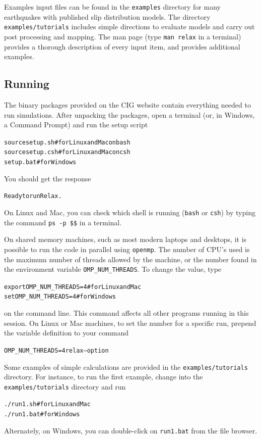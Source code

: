 \documentclass[10pt]{article}
\begin{document}
Examples input files can be found in the \verb'examples' directory for many earthquakes with published slip distribution models. The directory \verb'examples/tutorials' includes simple directions to evaluate models and carry out post processing and mapping. The man page (type \verb'man relax' in a terminal) provides a thorough description of every input item, and provides additional examples.

\subsection{Running}


The binary packages provided on the CIG website contain everything needed to run simulations.  After unpacking the packages, open a terminal (or, in Windows, a Command Prompt) and run the setup script
\begin{alltt}
{\color{orange}source setup.sh}  # for Linux and Mac on bash
{\color{orange}source setup.csh} # for Linux and Mac on csh
{\color{orange}setup.bat}        # for Windows
\end{alltt}
You should get the response
\begin{alltt}
{\color{NavyBlue}Ready to run Relax.}
\end{alltt}
On Linux and Mac, you can check which shell is running (\verb`bash` or \verb`csh`) by typing the command \verb`ps -p $$` in a terminal.

On shared memory machines, such as most modern laptops and desktops, it is possible to run the code in parallel using \verb'openmp'. The number of CPU's used is the maximum number of threads allowed by the machine, or the number found in the environment variable \verb'OMP_NUM_THREADS'. To change the value, type
\begin{alltt}
{\color{orange}export OMP_NUM_THREADS=4} # for Linux and Mac
{\color{orange}set OMP_NUM_THREADS=4}    # for Windows
\end{alltt}
on the command line. This command affects all other programs running
in this session. On Linux or Mac machines, to set the number for a
specific run, prepend the variable definition to your command
\begin{alltt}
{\color{orange}OMP_NUM_THREADS=4 relax --option}
\end{alltt}

Some examples of simple calculations are provided in the \verb'examples/tutorials' directory. For instance, to run the first example, change into the \verb'examples/tutorials' directory and run
\begin{alltt}
{\color{orange}./run1.sh}  # for Linux and Mac
{\color{orange}./run1.bat} # for Windows
\end{alltt}
Alternately, on Windows, you can double-click on \verb'run1.bat' from the file browser.
\end{document}
